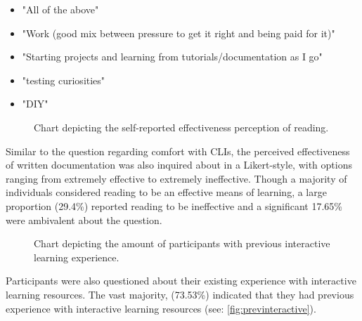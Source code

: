 \begin{itemize}[label={}, leftmargin=-2pt]
	\item \begin{quotes}
		      "All of the above"
	      \end{quotes}
	\item \begin{quotes}
		      "Work (good mix between pressure to get it right and being paid for it)"
	      \end{quotes}
	\item \begin{quotes}
		      "Starting projects and learning from tutorials/documentation as I go"
	      \end{quotes}
	\item \begin{quotes}
		      "testing curiosities"
	      \end{quotes}
	\item \begin{quotes}
		      "DIY"
	      \end{quotes}
\end{itemize}

\begin{figure}[htbp]
	\scalebox{0.72}{}
	\caption{Chart depicting the self-reported effectiveness perception of reading.}
	\label{fig:reading}
\end{figure}

Similar to the question regarding comfort with CLIs, the perceived
effectiveness of written documentation was also inquired about in a
Likert-style, with options ranging from extremely effective to extremely
ineffective. Though a majority of individuals considered reading to be an
effective means of learning, a large proportion (29.4\%) reported reading to be
ineffective and a significant 17.65\% were ambivalent about the question.

\begin{figure}[H]
	\centering
	\scalebox{0.65}{}
	\caption{Chart depicting the amount of participants with previous interactive learning experience.}
	\label{fig:previnteractive}
\end{figure}

Participants were also questioned about their existing experience with
interactive learning resources. The vast majority, (73.53\%) indicated that
they had previous experience with interactive learning resources (see:
\autoref{fig:previnteractive}).
